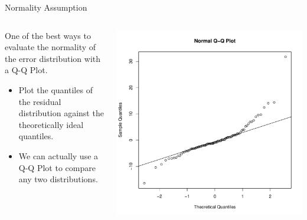 \documentclass{beamer}\usepackage[]{graphicx}\usepackage[]{color}
\makeatletter
\def\maxwidth{ %
  \ifdim\Gin@nat@width>\linewidth
    \linewidth
  \else
    \Gin@nat@width
  \fi
}
\newenvironment{knitrout}{}{} %
\makeatother
\begin{document}
\begin{frame}{Normality Assumption}

  \begin{columns}
    \begin{column}{0.5\textwidth}
      
      One of the best ways to evaluate the normality of the error distribution 
      with a Q-Q Plot.
      \vc
      \begin{itemize}
      \item Plot the quantiles of the residual distribution against the 
        theoretically ideal quantiles.
        \vc
      \item We can actually use a Q-Q Plot to compare any two distributions.
      \end{itemize}
      
    \end{column}
    
    \begin{column}{0.5\textwidth}
      
\begin{knitrout}\footnotesize
{}\color{fgcolor}

{\centering \includegraphics[width=\maxwidth]{figure/unnamed-chunk-23-1} 

}



\end{knitrout}

    \end{column}
  \end{columns}
  
\end{frame}
\end{document}
